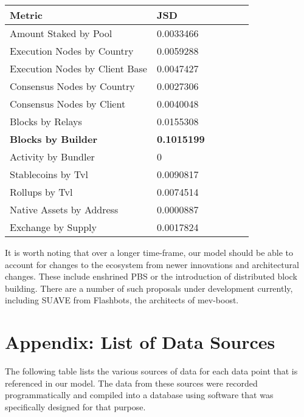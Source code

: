 \documentclass[conference]{IEEEtran}
\begin{document}
\vspace{8pt}

\begin{center}
\begin{tabular*}{\linewidth}{@{\extracolsep{\fill}} llllll }
\hline
\textbf{Metric} & \textbf{JSD} \\ \hline
Amount Staked by Pool & 0.0033466 \\
Execution Nodes by Country & 0.0059288 \\
Execution Nodes by Client Base & 0.0047427 \\
Consensus Nodes by Country & 0.0027306 \\
Consensus Nodes by Client & 0.0040048 \\
Blocks by Relays & 0.0155308 \\
\textbf{Blocks by Builder} & \textbf{0.1015199} \\ \hline
Activity by Bundler & 0 \\
Stablecoins by Tvl & 0.0090817 \\
Rollups by Tvl & 0.0074514 \\
Native Assets by Address & 0.0000887 \\
Exchange by Supply & 0.0017824 \\ \hline
\end{tabular*}
\end{center}

\vspace{8pt}

It is worth noting that over a longer time-frame, our model should be able to account for changes to the ecosystem from newer innovations and architectural changes.  These include enshrined PBS or the introduction of distributed block building.  There are a number of such proposals under development currently, including SUAVE from Flashbots, the architects of mev-boost.

\newpage

\printbibliography

\newpage

\onecolumn

\section{Appendix: List of Data Sources}

\vspace{12pt}

The following table lists the various sources of data for each data point that is referenced in our model.  The data from these sources were recorded programmatically and compiled into a database using software that was specifically designed for that purpose.
\end{document}

